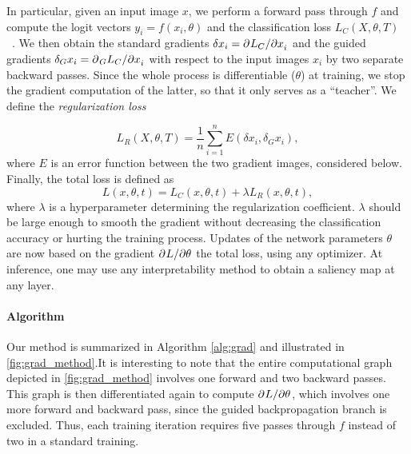 \noindent In particular, given an input image $x$, we perform a forward pass through $f$ and 
compute the logit vectors $y_i = f(x_i, \theta)$ and the classification loss $L_C(X, \theta, T)$
~. We then obtain the standard gradients $\delta x_i = \partial^{}{L_C}/\partial{x_i^{}}$ and the guided 
gradients $\delta_G x_i = \partial^{}{_G L_C}/\partial{x_i^{}}$ with respect to the input images $x_i$ by two 
separate backward passes. Since the whole process is differentiable (\wrt $\theta$) at training, 
we stop the gradient computation of the latter, so that it only serves as a ``teacher''. We define 
the \emph{regularization loss} 

\begin{equation}
	L_R(X, \theta, T) = \frac{1}{n} \sum_{i=1}^n E(\delta x_i, \delta_G x_i),
\label{eq:reg}
\end{equation}
where $E$ is an error function between the two gradient images, considered below.\\

\noindent Finally, the total loss is defined as
\begin{equation}
	L(x, \theta, t) = L_C(x, \theta, t) + \lambda L_R(x, \theta, t),
\label{eq:total}
\end{equation}
where $\lambda$ is a hyperparameter determining the regularization coefficient. 
$\lambda$ should be large enough to smooth the gradient without decreasing the classification 
accuracy or hurting the training process. 
Updates of the network parameters $\theta$ are now based on the gradient $\partial^{}{L}/\partial{\theta^{}}$ 
\wrt the total loss, using any optimizer. At inference, one may use any interpretability method 
to obtain a saliency map at any layer.

\paragraph{Algorithm}
Our method is summarized in Algorithm \ref{alg:grad} %
and illustrated in \ref{fig:grad_method}.It is interesting to note that the entire computational 
graph depicted in \ref{fig:grad_method} involves one forward and two backward passes. This graph is 
then differentiated again to compute $\partial^{}{L}/\partial{\theta^{}}$, which involves one more forward and 
backward pass, since the guided backpropagation branch is excluded. Thus, each training iteration 
requires five passes through $f$ instead of two in a standard training.


